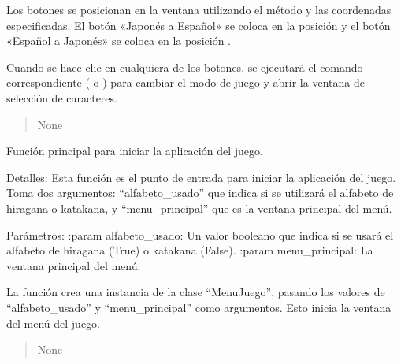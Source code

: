 \documentclass[letterpaper,10pt,spanish]{sphinxmanual}
\begin{document}
\begin{fulllineitems}
\begin{fulllineitems}
\sphinxAtStartPar
Los botones se posicionan en la ventana utilizando el método  y las coordenadas  especificadas.
El botón «Japonés a Español» se coloca en la posición  y el botón «Español a Japonés» se coloca en la
posición .

\sphinxAtStartPar
Cuando se hace clic en cualquiera de los botones, se ejecutará el comando correspondiente (
 o ) para cambiar el modo de juego y abrir la ventana de
selección de caracteres.
\begin{quote}\begin{description}
\sphinxAtStartPar
None

\end{description}\end{quote}

\end{fulllineitems}


\end{fulllineitems}


\begin{fulllineitems}
\label{\detokenize{menu_juego:menu_juego.main}}
\pysigstartsignatures
{}
\pysigstopsignatures
\sphinxAtStartPar
Función principal para iniciar la aplicación del juego.

\sphinxAtStartPar
Detalles:
Esta función es el punto de entrada para iniciar la aplicación del juego. Toma dos argumentos: “alfabeto\_usado”
que indica si se utilizará el alfabeto de hiragana o katakana, y “menu\_principal” que es la ventana principal
del menú.

\sphinxAtStartPar
Parámetros:
:param alfabeto\_usado: Un valor booleano que indica si se usará el alfabeto de hiragana (True) o katakana (False).
:param menu\_principal: La ventana principal del menú.

\sphinxAtStartPar
La función crea una instancia de la clase “MenuJuego”, pasando los valores de “alfabeto\_usado” y “menu\_principal”
como argumentos. Esto inicia la ventana del menú del juego.
\begin{quote}\begin{description}
\sphinxAtStartPar
None

\end{description}\end{quote}

\end{fulllineitems}
\end{document}
